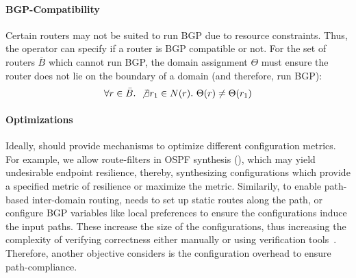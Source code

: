 \paragraph{BGP-Compatibility} Certain 
	routers may not be suited to run BGP due to resource
	constraints. Thus, the operator can specify if a 
	router is BGP compatible or not.  
	For the set of routers $\bar{B}$ which cannot run BGP, the
	domain assignment $\Theta$ must ensure the router
	does not lie on the boundary of a domain (and therefore,
	run BGP):
\begin{equation}
	\forall r \in \bar{B}. ~\not\exists r_1 \in N(r).~\Theta(r) \not= \Theta(r_1) 
\end{equation} 

\paragraph{Optimizations}  
Ideally, \name should provide mechanisms to optimize
different configuration metrics. For example,
we allow route-filters in OSPF synthesis 
(), which may yield undesirable
endpoint resilience, thereby, synthesizing configurations
which provide a specified metric of resilience or maximize
the metric. Similarily, to enable path-based inter-domain routing, 
\name needs	to set up static routes along the path, or configure BGP 
variables like local preferences to ensure the configurations 
induce the input paths.
These increase the size of the configurations,
thus increasing the complexity of verifying correctness either 
manually or using verification tools~\cite{batfish, arc, era}. 
Therefore,
another objective \name considers is the configuration overhead
to ensure path-compliance.